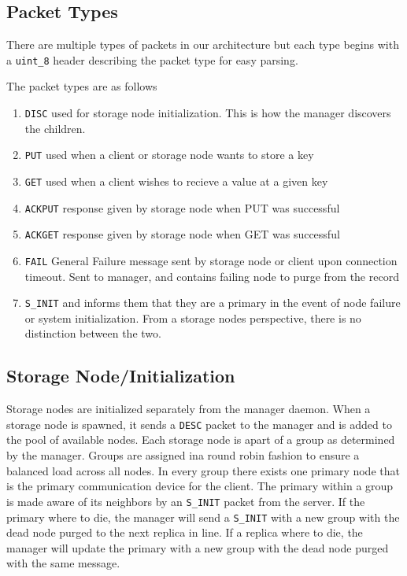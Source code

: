\documentclass{article}
\begin{document}
\subsection{Packet Types}
There are multiple types of packets in our architecture but each type begins with a \texttt{uint\_8} header describing the packet type for easy parsing.

The packet types are as follows
\begin{enumerate}
    \item \texttt{DISC}
    \subitem used for storage node initialization. This is how the manager discovers the children.
    \item \texttt{PUT}
    \subitem used when a client or storage node wants to store a key
    \item \texttt{GET}
    \subitem used when a client wishes to recieve a value at a given key
    \item \texttt{ACKPUT}
    \subitem response given by storage node when PUT was successful
    \item \texttt{ACKGET}
    \subitem response given by storage node when GET was successful
    \item \texttt{FAIL}
    \subitem General Failure message sent by storage node or client upon connection timeout. Sent to manager, and contains failing node to purge from the record
    \item \texttt{S\_INIT}
    \subitem and informs them that they are a primary in the event of node 
    failure or system initialization. From a storage nodes perspective, there is no distinction between the two.
\end{enumerate}

\subsection{Storage Node/Initialization}
Storage nodes are initialized separately from the manager daemon.
When a storage node is spawned, it sends a \texttt{DESC} packet to the manager and is added to the pool of available nodes.
Each storage node is apart of a group as determined by the manager.
Groups are assigned ina round robin fashion to ensure a balanced load across all nodes. 
In every group there exists one primary node that is the primary communication device for the client.
The primary within a group is made aware of its neighbors by an \texttt{S\_INIT} packet from the server. If the primary where to die, 
the manager will send a \texttt{S\_INIT} with a new group with the dead node purged to the next replica in line. If a replica where to die,
the manager will update the primary with a new group with the dead node purged with the same message.
\pagebreak
\end{document}
